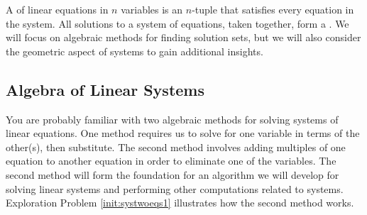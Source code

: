 \documentclass{ximera}
\begin{document}
A  of linear equations in $n$ variables is an $n$-tuple that satisfies every equation in  the system.  All solutions to a system of equations, taken together, form a .
We will focus on algebraic methods for finding solution sets, but we will also consider the geometric aspect of systems to gain additional insights.

\subsection*{Algebra of Linear Systems}

You are probably familiar with two algebraic methods for solving systems of linear equations.  One method requires us to solve for one variable in terms of the other(s), then substitute.  The second method involves adding multiples of one equation to another equation in order to eliminate one of the variables.  The second method will form the foundation for an algorithm we will develop for solving linear systems and performing other computations related to systems.  Exploration Problem \ref{init:systwoeqs1} illustrates how the second method works.
\end{document}
